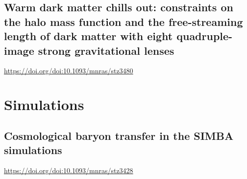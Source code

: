 \subsection*{Warm dark matter chills out: constraints on the halo mass function and the free-streaming length of dark matter with eight quadruple-image strong gravitational lenses}
\url{https://doi.org/doi:10.1093/mnras/stz3480}



\section{Simulations}


\subsection*{Cosmological baryon transfer in the SIMBA simulations}
\url{https://doi.org/doi:10.1093/mnras/stz3428}